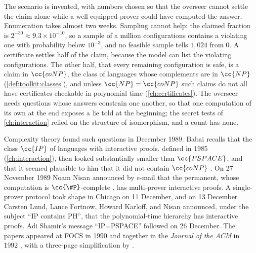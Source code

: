 \begin{refsection}
The scenario is invented, with numbers chosen so that the overseer cannot settle the claim alone while a well-equipped prover could have computed the answer. Enumeration takes almost two weeks. Sampling cannot help: the claimed fraction is $2^{-30}\approx9.3\times10^{-10}$, so a sample of a million configurations contains a violating one with probability below $10^{-3}$, and no feasible sample tells $1{,}024$ from $0$. A certificate settles half of the claim, because the model can list the violating configurations. The other half, that every remaining configuration is safe, is a claim in $\cc{coNP}$, the class of languages whose complements are in $\cc{NP}$ (\cref{def:toolkit:classes}), and unless $\cc{NP}=\cc{coNP}$ such claims do not all have certificates checkable in polynomial time (\cref{ch:certificates}). The overseer needs questions whose answers constrain one another, so that one computation of its own at the end exposes a lie told at the beginning; the secret tests of \cref{ch:interaction} relied on the structure of isomorphism, and a count has none.

Complexity theory found such questions in December 1989. Babai recalls that the class $\cc{IP}$ of languages with interactive proofs, defined in 1985 (\cref{ch:interaction}), then looked substantially smaller than $\cc{PSPACE}$, and that it seemed plausible to him that it did not contain $\cc{coNP}$ \parencite{Babai1990}. On 27 November 1989 Noam Nisan announced by e-mail that the permanent, whose computation is $\cc{\#P}$-complete \parencite{Valiant1979}, has multi-prover interactive proofs. A single-prover protocol took shape in Chicago on 11 December, and on 13 December Carsten Lund, Lance Fortnow, Howard Karloff, and Nisan announced, under the subject ``IP contains PH'', that the polynomial-time hierarchy has interactive proofs. Adi Shamir's message ``IP=PSPACE'' followed on 26 December. The papers appeared at FOCS in 1990 and together in the \emph{Journal of the ACM} in 1992 \parencite{LundEtAl1992,Shamir1992}, with a three-page simplification by \textcite{Shen1992}.


\end{refsection}
